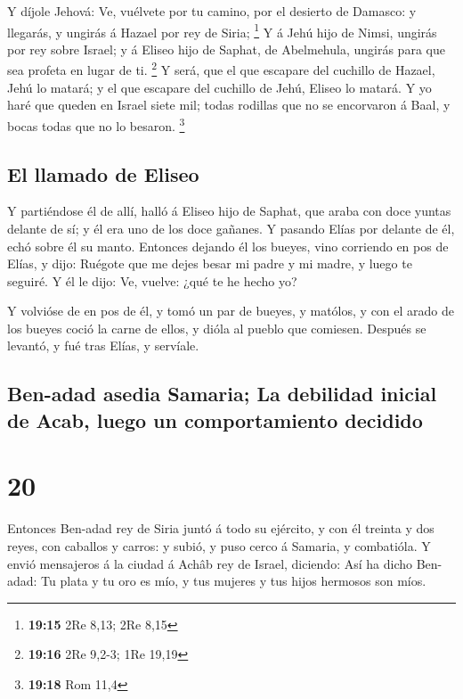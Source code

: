  Y díjole Jehová: Ve, vuélvete por tu camino, por el
desierto de Damasco: y llegarás, y ungirás á Hazael por rey de Siria;
\footnote{\textbf{19:15} 2Re 8,13; 2Re 8,15}  Y á Jehú hijo
de Nimsi, ungirás por rey sobre Israel; y á Eliseo hijo de Saphat, de
Abelmehula, ungirás para que sea profeta en lugar de ti. \footnote{\textbf{19:16}
  2Re 9,2-3; 1Re 19,19}  Y será, que el que escapare del
cuchillo de Hazael, Jehú lo matará; y el que escapare del cuchillo de
Jehú, Eliseo lo matará.  Y yo haré que queden en Israel
siete mil; todas rodillas que no se encorvaron á Baal, y bocas todas que
no lo besaron. \footnote{\textbf{19:18} Rom 11,4}

\hypertarget{el-llamado-de-eliseo}{%
\subsection{El llamado de Eliseo}\label{el-llamado-de-eliseo}}

 Y partiéndose él de allí, halló á Eliseo hijo de Saphat,
que araba con doce yuntas delante de sí; y él era uno de los doce
gañanes. Y pasando Elías por delante de él, echó sobre él su manto.
 Entonces dejando él los bueyes, vino corriendo en pos de
Elías, y dijo: Ruégote que me dejes besar mi padre y mi madre, y luego
te seguiré. Y él le dijo: Ve, vuelve: ¿qué te he hecho yo?

 Y volvióse de en pos de él, y tomó un par de bueyes, y
matólos, y con el arado de los bueyes coció la carne de ellos, y dióla
al pueblo que comiesen. Después se levantó, y fué tras Elías, y
servíale.

\hypertarget{ben-adad-asedia-samaria-la-debilidad-inicial-de-acab-luego-un-comportamiento-decidido}{%
\subsection{Ben-adad asedia Samaria; La debilidad inicial de Acab, luego
un comportamiento
decidido}\label{ben-adad-asedia-samaria-la-debilidad-inicial-de-acab-luego-un-comportamiento-decidido}}

\hypertarget{section-19}{%
\section{20}\label{section-19}}

 Entonces Ben-adad rey de Siria juntó á todo su ejército, y
con él treinta y dos reyes, con caballos y carros: y subió, y puso cerco
á Samaria, y combatióla.  Y envió mensajeros á la ciudad á
Achâb rey de Israel, diciendo:  Así ha dicho Ben-adad: Tu
plata y tu oro es mío, y tus mujeres y tus hijos hermosos son míos.

